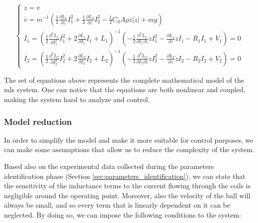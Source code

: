\begin{equation}
    \begin{cases}
        \dot{z} = v                                                                                                                                                                                                                                                                                       \\
        \dot{v} = m^{-1} \left(\frac{1}{2} \frac{\partial L_1}{\partial z} I_1^2 + \frac{1}{2} \frac{\partial L_2}{\partial z} I_2^2 - \frac{1}{2} C_d A \rho \dot{z} |\dot{z}| + m g  \right)                                                                                                            \\

        \dot{I_1} = \left( \frac{1}{2} \frac{\partial^2 L_1}{\partial I_1^2} I_1^2 + 2\frac{\partial L_1}{\partial I_1} I_1 + L_1 \right)^{-1} \left( -\frac{1}{2} \frac{\partial^2 L_1}{\partial I_1 \partial z} \dot{z} I_1^2 - \frac{\partial L_1}{\partial z} \dot{z} I_1 - R_1 I_1 + V_1 \right) = 0 \\
        \dot{I_2} = \left( \frac{1}{2} \frac{\partial^2 L_2}{\partial I_2^2} I_2^2 + 2\frac{\partial L_2}{\partial I_2} I_2 + L_2 \right)^{-1} \left( -\frac{1}{2} \frac{\partial^2 L_2}{\partial I_2 \partial z} \dot{z} I_2^2 - \frac{\partial L_2}{\partial z} \dot{z} I_2 - R_2 I_2 + V_2 \right) = 0
    \end{cases}
    \label{eq:equations_of_motion_full}
\end{equation}

The set of equations above represents the complete mathematical model of the \acrshort{mls} system.
One can notice that the equations are both nonlinear and coupled, making the system hard to analyze and control.

\subsubsection{Model reduction}
\label{subsubsec:model_reduction}

In order to simplify the model and make it more suitable for control purposes, we can make some assumptions that allow us to reduce the complexity of the system.

Based also on the experimental data collected during the parameters identification phase (Section \ref{sec:parameters_identification}), we can state that the sensitivity of the inductance terms to the current flowing through the coils is negligible around the operating point.
Moreover, also the velocity of the ball will always be small, and so every term that is linearly dependent on it can be neglected.
By doing so, we can impose the following conditions to the system:

